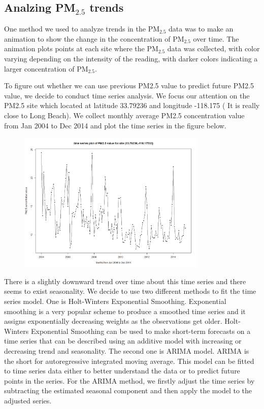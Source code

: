 \documentclass[10pt]{article}
\begin{document}
\subsection{Analzing PM$_{2.5}$ trends}
One method we used to analyze trends in the PM$_{2.5}$ data was to make an animation to show the change in the concentration of PM$_{2.5}$  over time. The animation plots points at each site where the PM$_{2.5}$ data was collected, with color varying depending on the intensity of the reading, with darker colors indicating a larger concentration of PM$_{2.5}$. 

To figure out whether we can use previous PM2.5 value to predict future PM2.5 value, we decide to conduct time series analysis. We focus our attention on the PM2.5 site which located at latitude 33.79236 and longitude -118.175 ( It is really close to Long Beach). We collect monthly average PM2.5 concentration value from Jan 2004 to Dec 2014 and plot the time series in the figure below.

\begin{figure}[ht!]
\centering
\includegraphics[width = 90mm]{ts1.png}
\end{figure}

There is a slightly downward trend over time about this time series and there seems to exist seasonality. We decide to use two different methods to fit the time series model. One is Holt-Winters Exponential Smoothing. Exponential smoothing is a very popular scheme to produce a smoothed time series and it assigns exponentially decreasing weights as the observations get older. Holt-Winters Exponential Smoothing can be used to make short-term forecasts on a time series that can be described using an additive model with increasing or decreasing trend and seasonality. The second one is ARIMA model. ARIMA is the short for autoregressive integrated moving average. This model can be fitted to time series data either to better understand the data or to predict future points in the series. For the ARIMA method, we firstly adjust the time series by subtracting the estimated seasonal component and then apply the model to the adjusted series.
\end{document}
